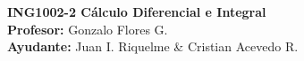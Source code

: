 \documentclass[letterpaper,12pt]{article}
\theoremstyle{plain}
\theoremstyle{definition}
\begin{document}
\def\Pauta{1}
	
	
	\begin{minipage}{11.5 cm}
         \vspace{-6mm}
		\begin{flushleft}
			\vspace{1mm}
			\textbf{ING1002-2 Cálculo Diferencial e Integral}\\
			\textbf{Profesor:}  Gonzalo Flores G.  \\
			\textbf{Ayudante:}  Juan I. Riquelme \& Cristian Acevedo R. \\
		\end{flushleft}
	\end{minipage}
	
\end{document}
